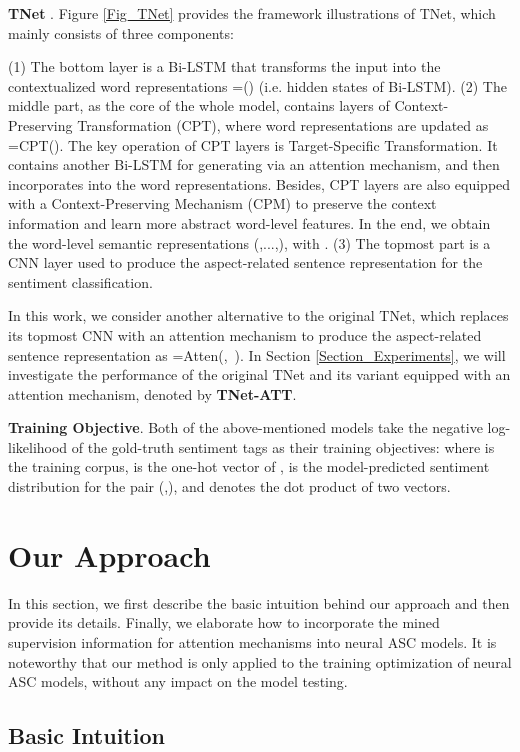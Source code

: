 \documentclass[11pt,a4paper]{article}
\begin{document}
\textbf{TNet} \cite{Li:ACL2018}.
Figure \ref{Fig_TNet} provides the framework illustrations of TNet,
which mainly consists of three components:

(1) The bottom layer is a
Bi-LSTM that transforms the input  into the contextualized word representations =() (i.e. hidden states of Bi-LSTM).
(2) The middle part, as the core of the whole model,
contains  layers of Context-Preserving Transformation (CPT),
where word representations are updated as =CPT().
The key operation of CPT layers is Target-Specific Transformation.
It contains another Bi-LSTM for generating  via an attention mechanism,
and then incorporates  into the word representations.
Besides,
CPT layers are also equipped with a Context-Preserving Mechanism (CPM) to
preserve the context information and learn more abstract word-level features.
In the end,
we obtain the word-level semantic representations (,...,), 
with .
(3) The topmost part is a CNN layer used to produce the aspect-related sentence representation  for the sentiment classification.

In this work,
we consider another alternative to the original TNet,
which replaces its topmost CNN with an attention mechanism to produce the aspect-related sentence representation as =Atten(,\ ).
In Section \ref{Section_Experiments},
we will investigate the performance of
the original TNet and its variant equipped with an attention mechanism,
denoted by \textbf{TNet-ATT}.


\textbf{Training Objective}.
Both of the above-mentioned models take the negative log-likelihood of the gold-truth sentiment tags as their training objectives:
where  is the training corpus,
 is the one-hot vector of ,
 is the model-predicted sentiment distribution for the pair (,),
and  denotes the dot product of two vectors.




\section{Our Approach}\label{Section_OurApproach}
In this section,
we first describe the basic intuition behind our approach and then provide its details.
Finally,
we elaborate how to incorporate the mined supervision information for attention mechanisms into neural ASC models.
It is noteworthy that our method is only applied to the training optimization of neural ASC models,
without any impact on the model testing.


\subsection{Basic Intuition}\label{SubSection_BasicIntuition}
\end{document}
